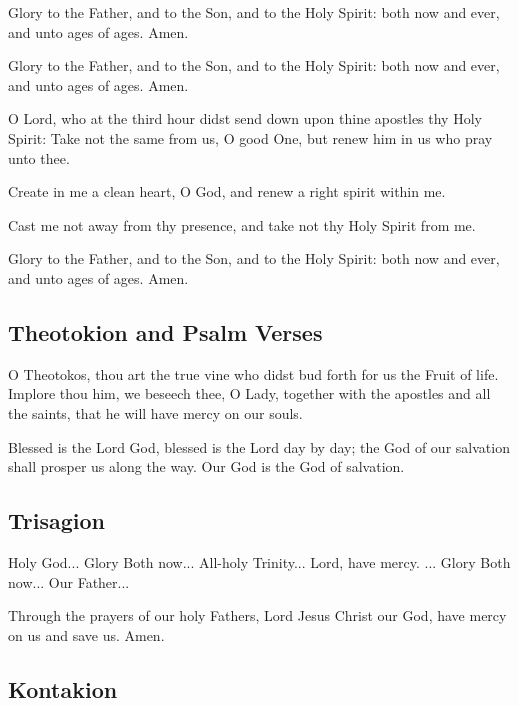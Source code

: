 Glory to the Father, and to the Son, and to the Holy Spirit: both now and ever, and unto ages of ages. Amen.


Glory to the Father, and to the Son, and to the Holy Spirit: both now and ever, and unto ages of ages. Amen.

O Lord, who at the third hour didst send down upon thine apostles thy Holy Spirit: Take not the same from us, O good One, but renew him in us who pray unto thee. 

 Create in me a clean heart, O God, and renew a right spirit within me. 

 Cast me not away from thy presence, and take not thy Holy Spirit from me. 

Glory to the Father, and to the Son, and to the Holy Spirit: both now and ever, and unto ages of ages. Amen.

\subsection{Theotokion and Psalm Verses}

O Theotokos, thou art the true vine who didst bud forth for us the Fruit of life. Implore thou him, we beseech thee, O Lady, together with the apostles and all the saints, that he will have mercy on our souls.

Blessed is the Lord God, blessed is the Lord day by day; the God of our salvation shall prosper us along the way. Our God is the God of salvation.

\subsection{Trisagion}

Holy God... Glory  Both now... All-holy Trinity... Lord, have mercy. ... Glory  Both now... Our Father...

Through the prayers of our holy Fathers, Lord Jesus Christ our God, have mercy on us and save us. Amen.

\subsection{Kontakion}

